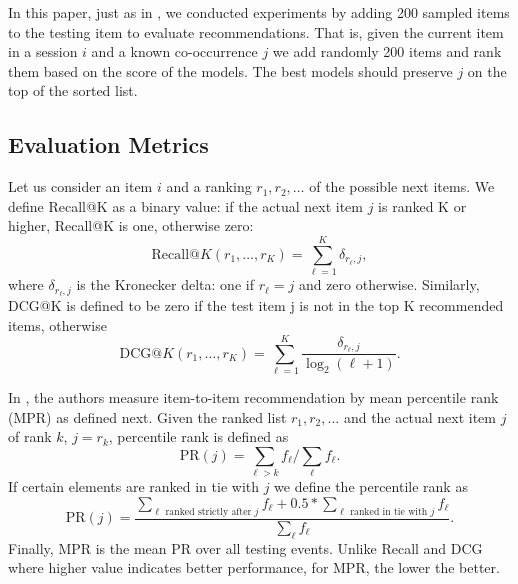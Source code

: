 In this paper, just as in \cite{koenigstein2013towards}, we conducted experiments by adding 200 sampled items to the testing item to evaluate recommendations. That is, given the current item in a session $i$ and a known co-occurrence $j$ we add randomly 200 items and rank them based on the score of the models. The best models should preserve $j$ on the top of the sorted list.

\subsection{Evaluation Metrics}

Let us consider an item $i$ and a ranking $r_1,r_2,\ldots$ of the possible next items.
We define Recall@K as a binary value: if the actual next item $j$ is ranked K or higher, Recall@K is one, otherwise zero:
%
\begin{equation}
\mbox{Recall@}K(r_1,\ldots,r_K) = \sum_{\ell=1}^K \delta_{r_\ell,j},
\nonumber
\end{equation}
where $\delta_{r_\ell,j}$ is the Kronecker delta: one if $r_\ell=j$ and zero otherwise. Similarly, DCG@K is defined to be zero if the test 
item j is not in the top K recommended items, otherwise
\begin{equation}
\mbox{DCG@}K(r_1,\ldots,r_K) = \sum_{\ell=1}^K \frac{\delta_{r_\ell,j}}{\log_2(\ell+1)}.
\nonumber
\end{equation} 


In \cite{koenigstein2013towards}, the authors measure item-to-item recommendation by mean percentile rank (MPR) as defined next.
Given the ranked list $r_1,r_2,\ldots$ and the actual next item $j$ of rank $k$, $j=r_k$, percentile rank is defined as %
%
\begin{equation}
\text{PR}(j) = \sum_{\ell > k} f_\ell / \sum_\ell f_\ell.
\nonumber
\end{equation}
If certain elements are ranked in tie with $j$ we define the percentile rank as
\begin{equation}
\text{PR}(j) = \frac{\sum_{\text{$\ell$ ranked strictly after $j$}} f_\ell + 0.5*\sum_{\text{$\ell$ ranked in tie with $j$}} f_\ell} {\sum_\ell f_\ell}.
\nonumber
\end{equation}
%
Finally, MPR is the mean PR over all testing events.
Unlike Recall and DCG where higher value indicates better performance, for MPR, the lower the better.

